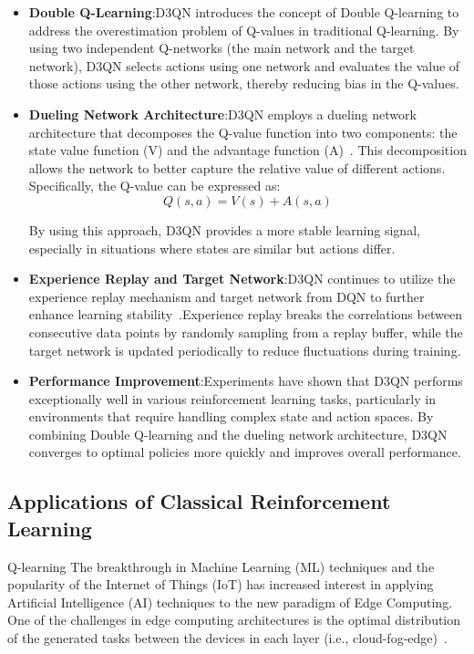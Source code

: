 \documentclass[journal]{IEEEtran}
\begin{document}
\begin{itemize}
\item \textbf{Double Q-Learning}:D3QN introduces the concept of Double Q-learning to address the overestimation problem of Q-values in traditional Q-learning. By using two independent Q-networks (the main network and the target network), D3QN selects actions using one network and evaluates the value of those actions using the other network, thereby reducing bias in the Q-values.
\item \textbf{Dueling Network Architecture}:D3QN employs a dueling network architecture that decomposes the Q-value function into two components: the state value function (V) and the advantage function (A)~\cite{pyyz002}. This decomposition allows the network to better capture the relative value of different actions. Specifically, the Q-value can be expressed as: \begin{equation}
    \mathit{Q}(s, a) = \mathit{V}(s) + \mathit{A}(s, a)
\end{equation}

By using this approach, D3QN provides a more stable learning signal, especially in situations where states are similar but actions differ.
\item \textbf{Experience Replay and Target Network}:D3QN continues to utilize the experience replay mechanism and target network from DQN to further enhance learning stability~\cite{pyyz003}.Experience replay breaks the correlations between consecutive data points by randomly sampling from a replay buffer, while the target network is updated periodically to reduce fluctuations during training.
\item \textbf{Performance Improvement}:Experiments have shown that D3QN performs exceptionally well in various reinforcement learning tasks, particularly in environments that require handling complex state and action spaces. By combining Double Q-learning and the dueling network architecture, D3QN converges to optimal policies more quickly and improves overall performance.
\end{itemize}

\subsection{Applications of Classical Reinforcement Learning}
Q-learning The breakthrough in Machine Learning (ML) techniques and the popularity of the Internet of Things (IoT) has increased interest in applying Artificial Intelligence (AI) techniques to the new paradigm of Edge Computing. One of the challenges in edge computing architectures is the optimal distribution of the generated tasks between the devices in each layer (i.e., cloud-fog-edge)~\cite{pyyz004}.
\end{document}
